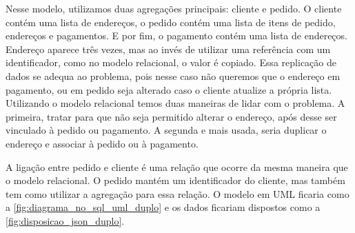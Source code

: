 Nesse modelo, utilizamos duas agregações principais: cliente e pedido. O cliente contém uma lista de endereços, o pedido contém uma lista de itens de pedido, endereços e pagamentos. E por fim, o pagamento contém uma lista de endereços. Endereço aparece três vezes, mas ao invés de utilizar uma referência com um identificador, como no modelo relacional, o valor é copiado. Essa replicação de dados se adequa ao problema, pois nesse caso não queremos que o endereço em pagamento, ou em pedido seja alterado caso o cliente atualize a própria lista.  Utilizando o modelo relacional temos duas maneiras de lidar com o problema. A primeira, tratar para que não seja permitido alterar o endereço, após desse ser vinculado à pedido ou pagamento. A segunda e mais usada, seria duplicar o endereço e associar à pedido ou à pagamento.

A ligação entre pedido e cliente é uma relação que ocorre da mesma maneira que o modelo relacional. O pedido mantém um identificador do cliente, mas também tem como utilizar a agregação para essa relação. O modelo em \ac{UML} ficaria como a \autoref{fig:diagrama_no_sql_uml_duplo} e os dados ficariam dispostos como a \autoref{fig:disposicao_json_duplo}.

